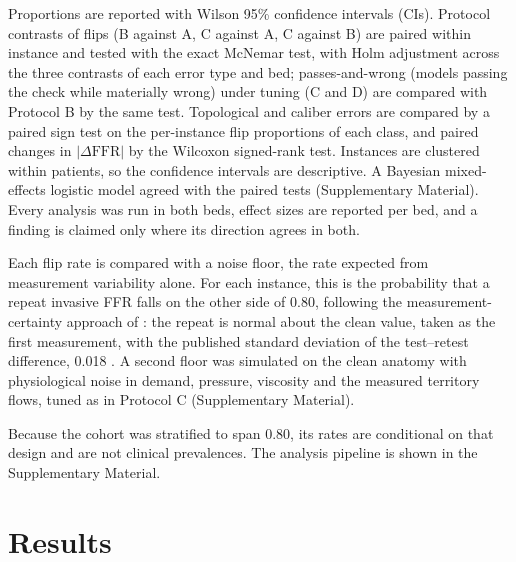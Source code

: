 \documentclass[journal,twoside,web]{ieeecolor}
\begin{document}
Proportions are reported with Wilson 95\% confidence intervals (CIs). Protocol contrasts of flips (B against A, C
against A, C against B) are paired within instance and tested with the exact McNemar test, with Holm adjustment
across the three contrasts of each error type and bed; passes-and-wrong (models passing the check while materially wrong) under tuning (C and D) are compared with
Protocol B by the same test. Topological and caliber errors are compared by a paired sign test on
the per-instance flip proportions of each class, and paired changes in $|\Delta\mathrm{FFR}|$ by the Wilcoxon
signed-rank test. Instances are clustered within patients, so the confidence intervals are descriptive. A Bayesian mixed-effects logistic model agreed with the paired tests (Supplementary Material). Every analysis was run in both beds, effect sizes are reported per bed, and a finding is
claimed only where its direction agrees in both.

Each flip rate is compared with a noise floor, the rate expected from measurement variability alone. For each instance, this is the probability that a repeat invasive FFR falls on the other side of 0.80, following the measurement-certainty approach of \cite{petraco2013}: the repeat is normal about the clean value, taken as the first measurement, with the published standard deviation of the test--retest difference, 0.018 \cite{johnson2015}. A second floor was simulated on the clean anatomy with physiological
noise in demand, pressure, viscosity and the measured territory flows, tuned as in Protocol C (Supplementary Material).

Because the cohort was stratified to span 0.80, its rates are conditional
on that design and are not clinical prevalences. The analysis pipeline is shown in the Supplementary Material.

\section{Results}
\end{document}
